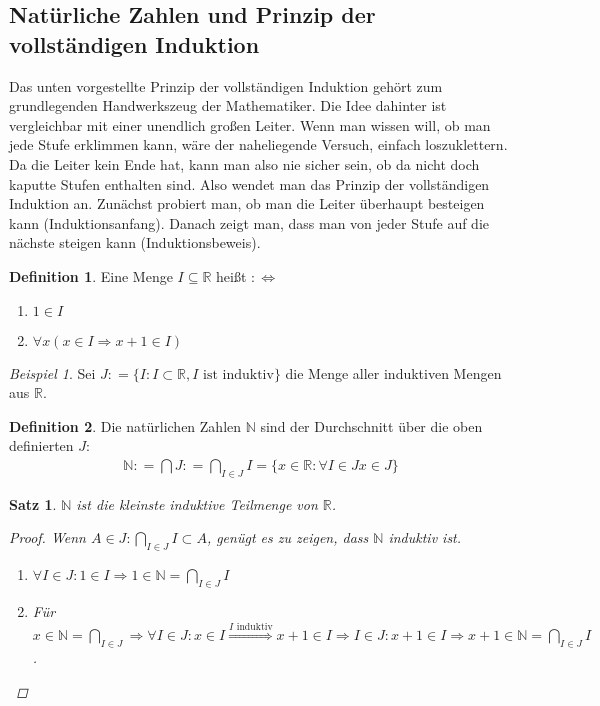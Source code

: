 \documentclass[ngerman,titlepage,twoside, parskip=half*]{scrreprt}
\newcommand*{\N}{\mathbb{N}}
\newcommand*{\R}{\mathbb{R}}
\newcommand*{\perdef}{:\Leftrightarrow}
\theoremstyle{plain}
\newtheorem{theorem}{Satz}[section]
\theoremstyle{definition}
\newtheorem{definition}{Definition}
\theoremstyle{remark}
\newtheorem*{beispiel}{Beispiel}
\newcommand*{\highl}[2][]{\textbf{\boldmath{#2}}%
  \ifthenelse{\equal{#1}{}}{\index{#2}}{\index{#1}}%
}
\newcommand*{\coloneqq}{\mathrel{\mathop:}=}
\begin{document}
\subsection{Natürliche Zahlen und Prinzip der vollständigen Induktion}
Das unten vorgestellte Prinzip der vollständigen Induktion gehört zum
grundlegenden Handwerkszeug der Mathematiker. Die Idee dahinter ist
vergleichbar mit einer unendlich großen Leiter. Wenn man wissen will, ob man
jede Stufe erklimmen kann, wäre der naheliegende Versuch, einfach
loszuklettern. Da die Leiter kein Ende hat, kann man also nie sicher sein, ob
da nicht doch kaputte Stufen enthalten sind. Also wendet man das Prinzip der
vollständigen Induktion an. Zunächst probiert man, ob man die Leiter überhaupt
besteigen kann (Induktionsanfang). Danach zeigt man, dass man von jeder Stufe
auf die nächste steigen kann (Induktionsbeweis).

\begin{definition}
  Eine Menge $I \subseteq \R$ heißt \highl{induktiv}$\perdef$
  \begin{enumerate}
  \item $1 \in I$
  \item $\forall x (x \in I \Rightarrow x+1 \in I)$
  \end{enumerate}
\end{definition}

\begin{beispiel}
  Sei $J\coloneqq\{I\colon I \subset \R, I \text{ ist induktiv}\}$ die
  Menge aller induktiven Mengen aus $\R$.
\end{beispiel}

\begin{definition}
  Die natürlichen Zahlen $\N$ sind der Durchschnitt über die oben definierten
  $J$:
  \begin{gather*}\N \coloneqq \bigcap J \coloneqq \bigcap_{I \in J} I = \{x \in \R \colon
  \forall I \in J x \in J\}\end{gather*}
\end{definition}

\begin{theorem}
  $\N$ ist die kleinste induktive Teilmenge von $\R$.
\begin{proof}
Wenn $A \in J \colon \bigcap_{I \in J} I \subset A$, genügt es zu zeigen,
dass $\N$  induktiv ist.
\begin{enumerate}
\item $\forall I \in J \colon 1 \in I \Rightarrow 1 \in \N = \bigcap_{I \in
    J} I$
\item Für $x \in \N = \bigcap_{I \in J} \Rightarrow \forall I \in J \colon x
  \in I \stackrel{I \text{ induktiv}}{\Longrightarrow} x+1 \in I\Rightarrow I
  \in J \colon x+1 \in I \Rightarrow x+1 \in \N = \bigcap_{I \in J} I$.
\end{enumerate}
\end{proof}
\end{theorem}
\end{document}
